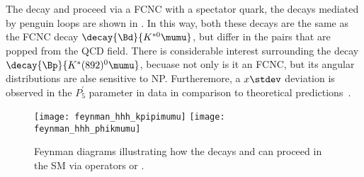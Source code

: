 The decay \btokpipimumu and \btophikmumu proceed via a \decay{\bquark}{\squark\mumu} FCNC with a
spectator \uquark quark, the decays mediated by penguin loops are shown in .
In this way, both these decays are the same as the FCNC decay $\decay{\Bd}{K^{*0}\mumu}$, but
differ in the \qqbar pairs that are popped from the QCD field.
There is considerable interest surrounding the decay $\decay{\Bp}{K^*(892)^0\mumu}$, becuase
not only is it an FCNC, but its angular distributions are alse sensitive to NP.
Furtheremore, a $x\stdev$ deviation is observed in the $P_5^\prime$ parameter in \lhcb data in
comparison to theoretical predictions~\cite{CAT}.




\begin{figure}
  \begin{center}
    \texttt{[image: feynman\_hhh\_kpipimumu]}
    \texttt{[image: feynman\_hhh\_phikmumu]}
    \caption[Feynman diagrams for \btokpipimumu and \btophikmumu]
    {\small
      Feynman diagrams illustrating how the decays \btokpipimumu and \btophikmumu can proceed in
      the SM via operators  or .
    }
    \label{fig:hhh:feyn}
  \end{center}
\end{figure}


